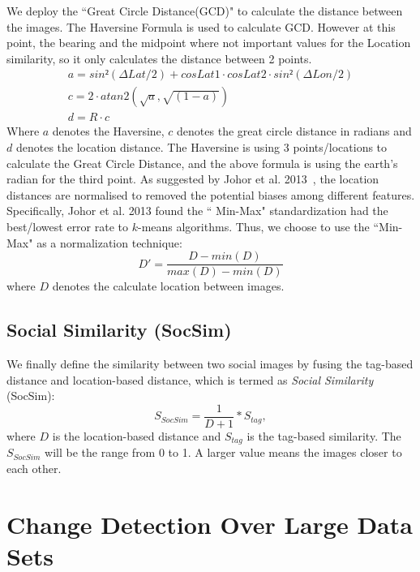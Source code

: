 \documentclass[runningheads,a4paper]{llncs}
\begin{document}
We deploy the ``Great Circle Distance(GCD)" to calculate the distance between the images. 
The Haversine Formula \cite{10.2307/2309088} is used to calculate GCD.
However at this point, the bearing and the midpoint where not important values for the Location similarity, so it only calculates the distance between 2 points.
\begin{eqnarray}
	a = sin²(ΔLat/2) + cos Lat1 ⋅ cos Lat2 ⋅ sin²(ΔLon/2)\\
	c = 2 ⋅ atan2(  \sqrt{a},  \sqrt{(1-a)} )\\
	d = R ⋅ c 
\end{eqnarray}
Where $a$ denotes the Haversine, $c$ denotes the great circle distance in radians and  $d$ denotes the location distance.
The Haversine is using 3 points/locations to calculate the Great Circle Distance, and the above formula is using the earth's radian for the third point.
As suggested by Johor et al. 2013~\cite{Standardization},
the location distances are normalised to removed the potential biases among different features. 
Specifically, 
Johor et al. 2013 \cite{Standardization} found the `` Min-Max" standardization had the best/lowest error rate to $k$-means algorithms. 
Thus, we choose to use the ``Min-Max" as a normalization technique:
\begin{equation}
D' = \frac{D-min(D)}{max(D)-min(D)}
\end{equation} 	
where $D$ denotes the calculate location between images.


\subsection{Social Similarity (SocSim) }

We finally define the similarity between two social images by fusing the tag-based distance and location-based distance,
which is termed as \emph{Social Similarity} (SocSim):
\begin{equation}
S_{SocSim} = \frac{1}{D+1} * S_{tag},
\end{equation} 	
where $D$ is the location-based distance and $S_{tag}$ is the tag-based similarity.
The $S_{SocSim}$ will be the range from 0 to 1. 
A larger value means the images closer to each other.

\section{Change Detection Over Large Data Sets}\label{sec-algorithm}
\end{document}
